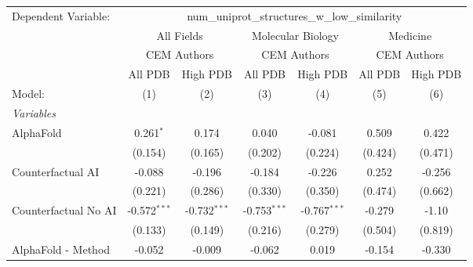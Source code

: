 \begingroup
\centering
\begin{tabular}{lcccccc}
   \tabularnewline \midrule \midrule
   Dependent Variable: & \multicolumn{6}{c}{num\_uniprot\_structures\_w\_low\_similarity}\\
 & \multicolumn{2}{c}{All Fields} & \multicolumn{2}{c}{Molecular Biology} & \multicolumn{2}{c}{Medicine} \\
\cmidrule(lr){2-3} \cmidrule(lr){4-5} \cmidrule(lr){6-7}
 & \multicolumn{2}{c}{CEM Authors} & \multicolumn{2}{c}{CEM Authors} & \multicolumn{2}{c}{CEM Authors} \\
\cmidrule(lr){2-3} \cmidrule(lr){4-5} \cmidrule(lr){6-7}
 & \multicolumn{1}{c}{All PDB} & \multicolumn{1}{c}{High PDB} & \multicolumn{1}{c}{All PDB} & \multicolumn{1}{c}{High PDB} & \multicolumn{1}{c}{All PDB} & \multicolumn{1}{c}{High PDB} \\
\cmidrule(lr){2-2} \cmidrule(lr){3-3} \cmidrule(lr){4-4} \cmidrule(lr){5-5} \cmidrule(lr){6-6} \cmidrule(lr){7-7}
   Model:                                                     & (1)            & (2)            & (3)            & (4)            & (5)           & (6)\\  
   \midrule
   \emph{Variables}\\
   AlphaFold                                                  & 0.261$^{*}$    & 0.174          & 0.040          & -0.081         & 0.509         & 0.422\\   
                                                              & (0.154)        & (0.165)        & (0.202)        & (0.224)        & (0.424)       & (0.471)\\   
   Counterfactual AI                                          & -0.088         & -0.196         & -0.184         & -0.226         & 0.252         & -0.256\\   
                                                              & (0.221)        & (0.286)        & (0.330)        & (0.350)        & (0.474)       & (0.662)\\   
   Counterfactual No AI                                       & -0.572$^{***}$ & -0.732$^{***}$ & -0.753$^{***}$ & -0.767$^{***}$ & -0.279        & -1.10\\   
                                                              & (0.133)        & (0.149)        & (0.216)        & (0.279)        & (0.504)       & (0.819)\\   
   AlphaFold - Method                                         & -0.052         & -0.009         & -0.062         & 0.019          & -0.154        & -0.330\\   

\end{tabular}
